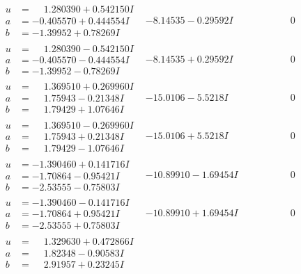 \documentclass[1p]{elsarticle_modified}
\theoremstyle{definition}
\begin{document}
$$\begin{array}{c|c|c}
 \hline 
\begin{aligned}
u &= \phantom{-}1.280390 + 0.542150 I \\
a &= -0.405570 + 0.444554 I \\
b &= -1.39952 + 0.78269 I\end{aligned}
 & -8.14535 - 0.29592 I & \phantom{-0.000000 } 0 \\ \hline\begin{aligned}
u &= \phantom{-}1.280390 - 0.542150 I \\
a &= -0.405570 - 0.444554 I \\
b &= -1.39952 - 0.78269 I\end{aligned}
 & -8.14535 + 0.29592 I & \phantom{-0.000000 } 0 \\ \hline\begin{aligned}
u &= \phantom{-}1.369510 + 0.269960 I \\
a &= \phantom{-}1.75943 - 0.21348 I \\
b &= \phantom{-}1.79429 + 1.07646 I\end{aligned}
 & -15.0106 - 5.5218 I & \phantom{-0.000000 } 0 \\ \hline\begin{aligned}
u &= \phantom{-}1.369510 - 0.269960 I \\
a &= \phantom{-}1.75943 + 0.21348 I \\
b &= \phantom{-}1.79429 - 1.07646 I\end{aligned}
 & -15.0106 + 5.5218 I & \phantom{-0.000000 } 0 \\ \hline\begin{aligned}
u &= -1.390460 + 0.141716 I \\
a &= -1.70864 - 0.95421 I \\
b &= -2.53555 - 0.75803 I\end{aligned}
 & -10.89910 - 1.69454 I & \phantom{-0.000000 } 0 \\ \hline\begin{aligned}
u &= -1.390460 - 0.141716 I \\
a &= -1.70864 + 0.95421 I \\
b &= -2.53555 + 0.75803 I\end{aligned}
 & -10.89910 + 1.69454 I & \phantom{-0.000000 } 0 \\ \hline\begin{aligned}
u &= \phantom{-}1.329630 + 0.472866 I \\
a &= \phantom{-}1.82348 - 0.90583 I \\
b &= \phantom{-}2.91957 + 0.23245 I\end{aligned}

\end{array}$$
\end{document}
